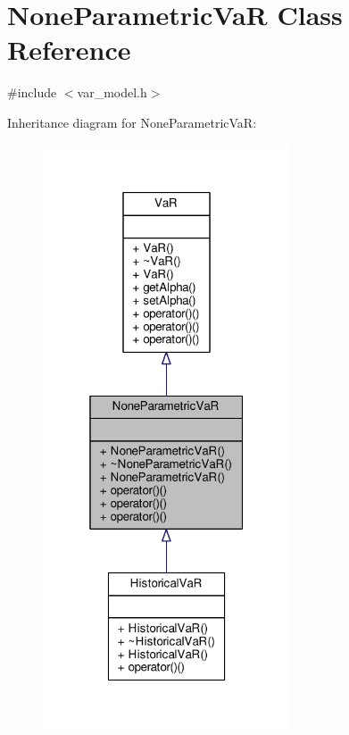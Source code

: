 \hypertarget{classNoneParametricVaR}{}\section{None\+Parametric\+VaR Class Reference}
\label{classNoneParametricVaR}


{\ttfamily \#include $<$var\+\_\+model.\+h$>$}



Inheritance diagram for None\+Parametric\+VaR\+:
\nopagebreak
\begin{figure}[H]
\begin{center}
\leavevmode
\includegraphics[width=208pt]{classNoneParametricVaR__inherit__graph}
\end{center}
\end{figure}


